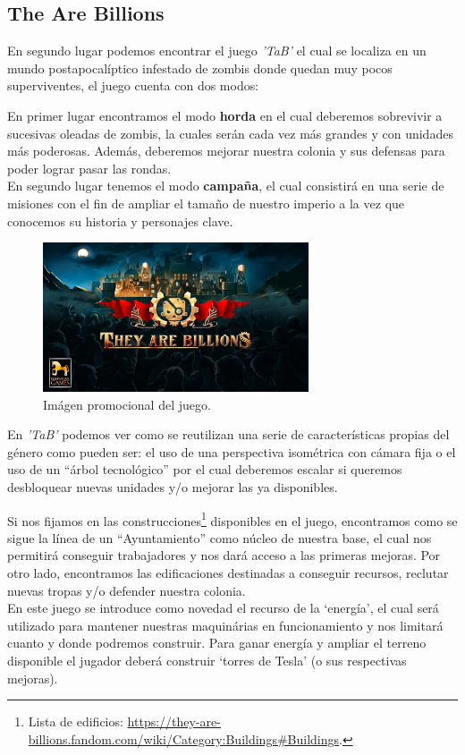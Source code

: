 \subsection{The Are Billions}
En segundo lugar podemos encontrar el juego \textit{'\acf{TaB}'} el cual se localiza en un
mundo postapocalíptico infestado de zombis donde quedan muy pocos superviventes, el juego
cuenta con dos modos:

En primer lugar encontramos el modo \textbf{horda} en el cual deberemos sobrevivir a
sucesivas oleadas de zombis, la cuales serán cada vez más grandes y con unidades más poderosas.
Además, deberemos mejorar nuestra colonia y sus defensas para poder lograr pasar las rondas.\\
En segundo lugar tenemos el modo \textbf{campaña}, el cual consistirá en una serie de misiones con el
fin de ampliar el tamaño de nuestro imperio a la vez que conocemos su historia y personajes
clave. 

\begin{figure}[ht]
\centering
\includegraphics[width=0.7\textwidth]{imagenes/marco_teo/referentes/tab_1.png}
\caption{Imágen promocional del juego.}
\label{img:tab_1}
\end{figure}

En \textit{'\ac{TaB}'} podemos ver como se reutilizan una serie de características propias
del género como pueden ser: el uso de una perspectiva isométrica con cámara fija o el uso de
un ``árbol tecnológico'' por el cual deberemos escalar si queremos desbloquear nuevas unidades
y/o mejorar las ya disponibles.

Si nos fijamos en las construcciones\footnote{Lista de edificios: \url{https://they-are-billions.fandom.com/wiki/Category:Buildings\#Buildings}.}
disponibles en el juego, encontramos como se sigue la línea de un ``Ayuntamiento'' como núcleo
de nuestra base, el cual nos permitirá conseguir trabajadores y nos dará acceso a las primeras
mejoras. Por otro lado, encontramos las edificaciones destinadas a conseguir recursos, reclutar
nuevas tropas y/o defender nuestra colonia. \\
En este juego se introduce como novedad el recurso de la `energía', el cual será utilizado
para mantener nuestras maquinárias en funcionamiento y nos limitará cuanto y donde podremos construir.  
Para ganar energía y ampliar el terreno disponible el jugador deberá construir `torres de Tesla' (o sus respectivas mejoras).



